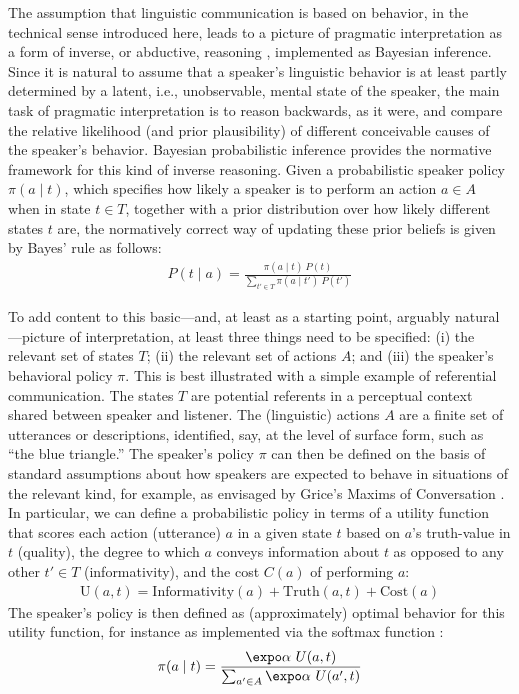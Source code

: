 \documentclass[fleqn,reqno,12pt]{article}
\newcommand{\real}{\acro{real}}
\begin{document}
The assumption that linguistic communication is based on \real behavior, in the technical sense introduced here, leads to a picture of pragmatic interpretation as a form of inverse, or abductive, reasoning \citep{HobbsStickel1993:Interpretation-,BuntBlack2000:Abduction-Belie,FrankeJager2015:Probabilistic-p}, implemented as Bayesian inference.
Since it is natural to assume that a speaker's linguistic behavior is at least partly determined by a latent, i.e., unobservable, mental state of the speaker, the main task of pragmatic interpretation is to reason backwards, as it were, and compare the relative likelihood (and prior plausibility) of different conceivable causes of the speaker's behavior.
Bayesian probabilistic inference provides the normative framework for this kind of inverse reasoning.
Given a probabilistic speaker policy $\pi(a \mid t)$, which specifies how likely a speaker is to perform an action $a \in A$ when in state $t \in T$, together with a prior distribution over how likely different states $t$ are, the normatively correct way of updating these prior beliefs is given by Bayes' rule as follows:
\begin{align}
    \label{eq:Bayes-rule-interpretation}
   P(t \mid a) = \frac{\pi(a \mid t) \ P(t)}{\sum_{t' \in T} \pi(a \mid t') \ P(t')}
\end{align}

To add content to this basic—and, at least as a starting point, arguably natural—picture of interpretation, at least three things need to be specified: (i) the relevant set of states $T$; (ii) the relevant set of actions $A$; and (iii) the speaker's behavioral policy $\pi$.
This is best illustrated with a simple example of referential communication.
The states $T$ are potential referents in a perceptual context shared between speaker and listener.
The (linguistic) actions $A$ are a finite set of utterances or descriptions, identified, say, at the level of surface form, such as ``the blue triangle.''
The speaker's policy $\pi$ can then be defined on the basis of standard assumptions about how speakers are expected to behave in situations of the relevant kind, for example, as envisaged by Grice's Maxims of Conversation \citep{Grice1975:Logic-and-Conve}.
In particular, we can define a probabilistic policy in terms of a utility function that scores each action (utterance) $a$ in a given state $t$ based on $a$'s truth-value in $t$ (quality), the degree to which $a$ conveys information about $t$ as opposed to any other $t' \in T$ (informativity), and the cost $C(a)$ of performing $a$:
\begin{align}
    \text{U}(a, t) = \text{Informativity}(a) + \text{Truth}(a,t) + \text{Cost}(a)
\end{align}
The speaker's policy is then defined as (approximately) optimal behavior for this utility function, for instance as implemented via the softmax function \citep{FrankeDegen2023:The-softmax-fun}:
\begin{align}
    \pi(a \mid t) = \frac{\expo \alpha \ U(a, t)}{\sum_{a' \in A} \expo \alpha \ U(a', t)}
\end{align}
\end{document}
